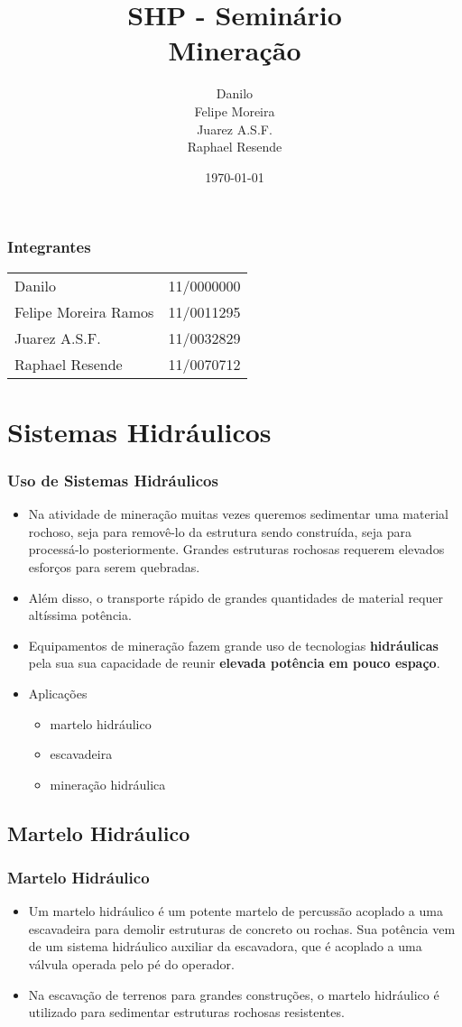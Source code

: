 \documentclass{beamer}
\title[Sistemas Hidráulicos e Pneumáticos]{ SHP - Seminário \\ Mineração}
\author{Danilo \\ Felipe Moreira \\ Juarez A.S.F. \\ Raphael Resende}
\institute{Universidade de Brasília}
\date{\today}
\begin{document}
\begin{frame}
        \titlepage
\end{frame}

\begin{frame}{}
	\frametitle{Integrantes}
	 \begin{tabular}{lr}
		Danilo           			& 11/0000000 \\
		Felipe Moreira Ramos 		& 11/0011295 \\
		Juarez A.S.F.				& 11/0032829 \\
		Raphael Resende             & 11/0070712
	\end{tabular}

\end{frame}

\section{Sistemas Hidráulicos}
\begin{frame}
	\frametitle{Uso de Sistemas Hidráulicos}
    \begin{itemize}
        \item Na atividade de mineração muitas vezes queremos sedimentar uma material rochoso, seja para removê-lo da estrutura sendo construída, seja para processá-lo posteriormente. Grandes estruturas rochosas requerem elevados esforços para serem quebradas.
        \item Além disso, o transporte rápido de grandes quantidades de material requer altíssima potência.
        \item Equipamentos de mineração fazem grande uso de tecnologias \textbf{hidráulicas} pela sua sua capacidade de reunir \textbf{elevada potência em pouco espaço}.
        \item Aplicações
            \begin{itemize}
                \item martelo hidráulico
                \item escavadeira
                \item mineração hidráulica  
            \end{itemize}
    \end{itemize}
\end{frame}

\subsection{Martelo Hidráulico}
\begin{frame}
	\frametitle{Martelo Hidráulico}
	\begin{itemize}
	\item Um martelo hidráulico é um potente martelo de percussão acoplado a uma escavadeira para demolir estruturas de concreto ou rochas. Sua potência vem de um sistema hidráulico auxiliar da escavadora, que é acoplado a uma válvula operada pelo pé do operador.
	\item Na escavação de terrenos para grandes construções, o martelo hidráulico é utilizado para sedimentar estruturas rochosas resistentes.
	\end{itemize}
\end{frame}
\end{document}
